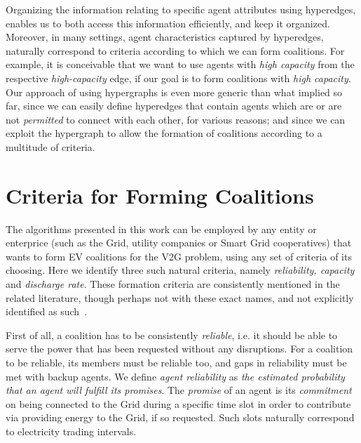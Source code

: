 


Organizing the information relating to specific agent attributes using hyperedges, enables us to both access this information efficiently, and keep it organized.
Moreover, in many settings, agent characteristics captured by hyperedges, naturally correspond to criteria according to which we can form coalitions.
For example, it is conceivable that we want to use agents with {\em high capacity} from the respective {\em high-capacity} edge, if our goal is to form coalitions with {\em high capacity}. Our approach of using hypergraphs is even more generic than what implied so far, since we can easily define hyperedges that contain agents which are or are not {\em permitted} to connect with each other, for various reasons; and since we can exploit the hypergraph to allow the formation of coalitions according to a multitude of criteria.

\section{Criteria for Forming Coalitions}
\label{subsec:criteria}

The algorithms presented in this work can be employed by any entity or enterprice (such as the Grid, utility companies or Smart Grid cooperatives) that wants to form EV coalitions for the V2G problem, using any set of criteria of its choosing. Here we identify three such natural criteria, namely \textit{reliability, capacity} and \textit{discharge rate}. These formation criteria are consistently mentioned in the related literature, though perhaps not with these exact names, and not explicitly identified as such~\cite{kamboj2010exploring,kamboj2011deploying,valogianni2014effective}.

First of all, a coalition has to be consistently {\em reliable}, i.e. it should be able to serve the power that has been requested without any disruptions. For a coalition to be reliable, its members must be reliable too, and gaps in reliability must be met with backup agents. We define {\em agent reliability} as {\em the estimated probability that an agent will fulfill its promises}. The {\em promise} of an agent is its {\em commitment} on being connected to the Grid during a specific time slot in order to contribute via providing energy to the Grid, if so requested. Such slots naturally correspond to electricity trading intervals.


